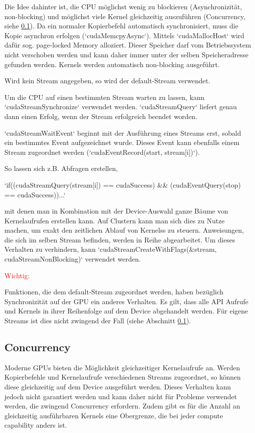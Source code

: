 		Die Idee dahinter ist, die CPU möglichst wenig zu blockieren (Asynchronizität, non-blocking) und möglichst viele \Gls{Kernel} gleichzeitig auszuführen (Concurrency, siehe \ref{async}). Da ein normaler Kopierbefehl automatisch synchronisiert, muss die Kopie asynchron erfolgen (\li`cudaMemcpyAsync`). Mittels \li`cudaMallocHost` wird dafür sog. \gls{page-locked Memory} alloziert. Dieser Speicher darf vom Betriebssystem nicht verschoben werden und kann daher immer unter der selben Speicheradresse gefunden werden. \Glspl{Kernel} werden automatisch non-blocking ausgeführt.
		
		Wird kein \Gls{Stream} angegeben, so wird der default-\Gls{Stream} verwendet.
		
		Um die CPU auf einen bestimmten \Gls{Stream} warten zu lassen, kann \li`cudaStreamSynchronize` verwendet werden. \li`cudaStreamQuery` liefert genau dann einen Erfolg, wenn der \Gls{Stream} erfolgreich beendet worden.	
		
		\li`cudaStreamWaitEvent` beginnt mit der Ausführung eines \Glspl{Stream} erst, sobald ein bestimmtes Event aufgezeichnet wurde. Dieses Event kann ebenfalls einem \Gls{Stream} zugeordnet werden (\li`cudaEventRecord(start, stream[i])`).
		
		So lassen sich z.B. Abfragen erstellen,
		
		\li`if((cudaStreamQuery(stream[i]) == cudaSuccess) && (cudaEventQuery(stop) == cudaSuccess))...`
		
		mit denen man in Kombination mit der Device-Auswahl ganze Bäume von \Gls{Kernel}aufrufen erstellen kann. Auf Clustern kann man sich dies zu Nutze machen, um exakt den zeitlichen Ablauf von \Glspl{Kernel}s zu steuern. Anweisungen, die sich im selben \Gls{Stream} befinden, werden in Reihe abgearbeitet. Um dieses Verhalten zu verhindern, kann \li`cudaStreamCreateWithFlags(&stream, cudaStreamNonBlocking)` verwendet werden.
		
		\textcolor{red}{Wichtig:}
		
		Funktionen, die dem default-\Gls{Stream} zugeordnet werden, haben bezüglich Synchronizität auf der GPU ein anderes Verhalten. Es gilt, dass alle \Gls{API} Aufrufe und \Glspl{Kernel} in ihrer Reihenfolge auf dem Device abgehandelt werden. Für eigene \Glspl{Stream} ist dies nicht zwingend der Fall (siehe Abschnitt \ref{async}).
		
		\subsection{Concurrency}\label{async}
		Moderne GPUs bieten die Möglichkeit gleichzeitiger \Gls{Kernel}aufrufe an. Werden Kopierbefehle und \Gls{Kernel}aufrufe verschiedenen \Glspl{Stream} zugeordnet, so können diese gleichzeitig auf dem Device ausgeführt werden. Dieses Verhalten kann jedoch nicht garantiert werden und kann daher nicht für Probleme verwendet werden, die zwingend Concurrency erfordern. Zudem gibt es für die Anzahl an gleichzeitig ausführbaren \Glspl{Kernel} eine Obergrenze, die bei jeder \Gls{compute capability} anders ist.
		
